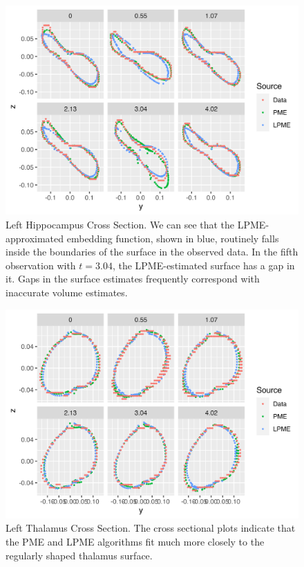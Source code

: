 \documentclass[11pt,reqno]{article}
\renewcommand{\textwidth}{180mm}
\theoremstyle{definition}
\begin{document}
\begin{figure}[h]
  \centering
  \includegraphics[height=8cm]{adni_plots/adni_cross_section}
  \caption{Left Hippocampus Cross Section. We can see that the LPME-approximated embedding function, shown in blue, routinely falls inside the boundaries of the surface in the observed data. In the fifth observation with $t=3.04$, the LPME-estimated surface has a gap in it. Gaps in the surface estimates frequently correspond with inaccurate volume estimates.}
  \label{fig:lhipp_cross_sections}
\end{figure}

\begin{figure}[h]
  \centering
  \includegraphics[height=8cm]{adni_plots/adni_lthal_cross_section}
  \caption{Left Thalamus Cross Section. The cross sectional plots indicate that the PME and LPME algorithms fit much more closely to the regularly shaped thalamus surface.}
  \label{fig:lthal_cross_sections}
\end{figure}
\end{document}
